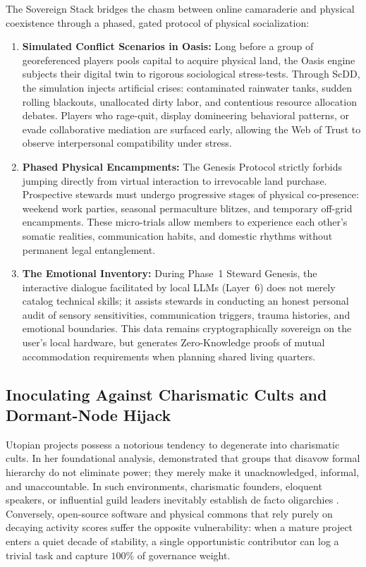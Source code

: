 The Sovereign Stack bridges the chasm between online camaraderie and physical coexistence through a phased, gated protocol of physical socialization:
\begin{enumerate}
    \item \textbf{Simulated Conflict Scenarios in Oasis:} Long before a group of georeferenced players pools capital to acquire physical land, the Oasis engine subjects their digital twin to rigorous sociological stress-tests. Through ScDD, the simulation injects artificial crises: contaminated rainwater tanks, sudden rolling blackouts, unallocated dirty labor, and contentious resource allocation debates. Players who rage-quit, display domineering behavioral patterns, or evade collaborative mediation are surfaced early, allowing the Web of Trust to observe interpersonal compatibility under stress.
    \item \textbf{Phased Physical Encampments:} The Genesis Protocol strictly forbids jumping directly from virtual interaction to irrevocable land purchase. Prospective stewards must undergo progressive stages of physical co-presence: weekend work parties, seasonal permaculture blitzes, and temporary off-grid encampments. These micro-trials allow members to experience each other's somatic realities, communication habits, and domestic rhythms without permanent legal entanglement.
    \item \textbf{The Emotional Inventory:} During Phase~1 Steward Genesis, the interactive dialogue facilitated by local LLMs (Layer~6) does not merely catalog technical skills; it assists stewards in conducting an honest personal audit of sensory sensitivities, communication triggers, trauma histories, and emotional boundaries. This data remains cryptographically sovereign on the user's local hardware, but generates Zero-Knowledge proofs of mutual accommodation requirements when planning shared living quarters.
\end{enumerate}

\subsection{Inoculating Against Charismatic Cults and Dormant-Node Hijack}

Utopian projects possess a notorious tendency to degenerate into charismatic cults. In her foundational analysis, \textcite{freeman1972} demonstrated that groups that disavow formal hierarchy do not eliminate power; they merely make it unacknowledged, informal, and unaccountable. In such environments, charismatic founders, eloquent speakers, or influential guild leaders inevitably establish de facto oligarchies \parencite{michels1911, kanter1972}. Conversely, open-source software and physical commons that rely purely on decaying activity scores suffer the opposite vulnerability: when a mature project enters a quiet decade of stability, a single opportunistic contributor can log a trivial task and capture $100\%$ of governance weight.


